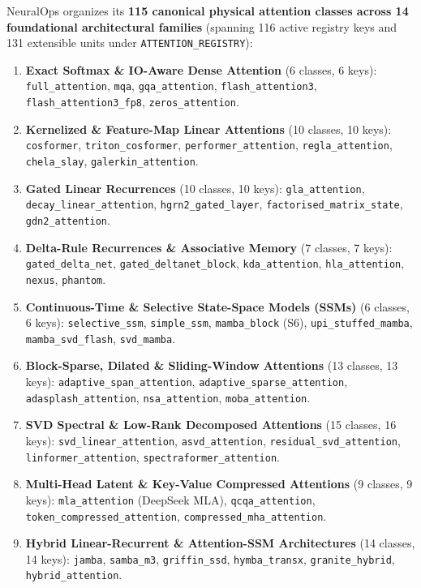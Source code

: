 \documentclass{article}
\begin{document}
NeuralOps organizes its \textbf{115 canonical physical attention classes across 14 foundational architectural families} (spanning 116 active registry keys and 131 extensible units under \texttt{ATTENTION\_REGISTRY}):
\begin{enumerate}
    \item \textbf{Exact Softmax \& IO-Aware Dense Attention} (6 classes, 6 keys): \texttt{full\_attention}, \texttt{mqa}, \texttt{gqa\_attention}, \texttt{flash\_attention3}, \texttt{flash\_attention3\_fp8}, \texttt{zeros\_attention}.
    \item \textbf{Kernelized \& Feature-Map Linear Attentions} (10 classes, 10 keys): \texttt{cosformer}, \texttt{triton\_cosformer}, \texttt{performer\_attention}, \texttt{regla\_attention}, \texttt{chela\_slay}, \texttt{galerkin\_attention}.
    \item \textbf{Gated Linear Recurrences} (10 classes, 10 keys): \texttt{gla\_attention}, \texttt{decay\_linear\_attention}, \texttt{hgrn2\_gated\_layer}, \texttt{factorised\_matrix\_state}, \texttt{gdn2\_attention}.
    \item \textbf{Delta-Rule Recurrences \& Associative Memory} (7 classes, 7 keys): \texttt{gated\_delta\_net}, \texttt{gated\_deltanet\_block}, \texttt{kda\_attention}, \texttt{hla\_attention}, \texttt{nexus}, \texttt{phantom}.
    \item \textbf{Continuous-Time \& Selective State-Space Models (SSMs)} (6 classes, 6 keys): \texttt{selective\_ssm}, \texttt{simple\_ssm}, \texttt{mamba\_block} (S6), \texttt{upi\_stuffed\_mamba}, \texttt{mamba\_svd\_flash}, \texttt{svd\_mamba}.
    \item \textbf{Block-Sparse, Dilated \& Sliding-Window Attentions} (13 classes, 13 keys): \texttt{adaptive\_span\_attention}, \texttt{adaptive\_sparse\_attention}, \texttt{adasplash\_attention}, \texttt{nsa\_attention}, \texttt{moba\_attention}.
    \item \textbf{SVD Spectral \& Low-Rank Decomposed Attentions} (15 classes, 16 keys): \texttt{svd\_linear\_attention}, \texttt{asvd\_attention}, \texttt{residual\_svd\_attention}, \texttt{linformer\_attention}, \texttt{spectraformer\_attention}.
    \item \textbf{Multi-Head Latent \& Key-Value Compressed Attentions} (9 classes, 9 keys): \texttt{mla\_attention} (DeepSeek MLA), \texttt{qcqa\_attention}, \texttt{token\_compressed\_attention}, \texttt{compressed\_mha\_attention}.
    \item \textbf{Hybrid Linear-Recurrent \& Attention-SSM Architectures} (14 classes, 14 keys): \texttt{jamba}, \texttt{samba\_m3}, \texttt{griffin\_ssd}, \texttt{hymba\_transx}, \texttt{granite\_hybrid}, \texttt{hybrid\_attention}.

\end{enumerate}
\end{document}
